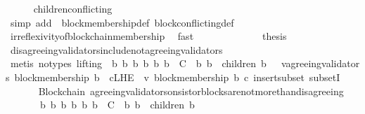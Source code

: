 \begin{isabellebody}
\ \ \ \ \isamarkupfalse%
\ children{\isacharunderscore}conflicting\isanewline
\ \ \ \ \isamarkupfalse%
\ {\isacharparenleft}simp\ add{\isacharcolon}\ \ block{\isacharunderscore}membership{\isacharunderscore}def\ block{\isacharunderscore}conflicting{\isacharunderscore}def{\isacharparenright}\isanewline
\ \ \ \ \isamarkupfalse%
\ irreflexivity{\isacharunderscore}of{\isacharunderscore}blockchain{\isacharunderscore}membership\ \isamarkupfalse%
\ fast\ \ \ \ \ \ \ \ \isanewline
\ \ \isamarkupfalse%
\ \isamarkupfalse%
\ {\isacharquery}thesis\isanewline
\ \ \ \ \isamarkupfalse%
\ disagreeing{\isacharunderscore}validators{\isacharunderscore}include{\isacharunderscore}not{\isacharunderscore}agreeing{\isacharunderscore}validators\isanewline
\ \ \ \ \isamarkupfalse%
\ {\isacharparenleft}metis\ {\isacharparenleft}no{\isacharunderscore}types{\isacharcomma}\ lifting{\isacharparenright}\ {\isacartoucheopen}{\isasymforall}{\isasymsigma}{\isasymin}{\isasymSigma}{\isachardot}\ {\isasymforall}b\ b{}\ b{}{\isachardot}\ {\isacharbraceleft}b{\isacharcomma}\ b{}{\isacharcomma}\ b{}{\isacharbraceright}\ {\isasymsubseteq}\ C\ {\isasymand}\ {\isacharbraceleft}b{}{\isacharcomma}\ b{}{\isacharbraceright}\ {\isasymsubseteq}\ children\ {\isacharparenleft}b{\isacharcomma}\ {\isasymsigma}{\isacharparenright}\ {\isasymlongrightarrow}\ {\isacharparenleft}{\isasymforall}v{\isasymin}agreeing{\isacharunderscore}validators\ {\isacharparenleft}block{\isacharunderscore}membership\ b{}{\isacharcomma}\ {\isasymsigma}{\isacharparenright}{\isachardot}\ {\isasymforall}c{\isasymin}L{\isacharunderscore}H{\isacharunderscore}E\ {\isasymsigma}\ v{\isachardot}\ block{\isacharunderscore}membership\ b{}\ c{\isacharparenright}{\isacartoucheclose}\ insert{\isacharunderscore}subset\ subsetI{\isacharparenright}\ \ \ \ \isanewline
{}\isamarkupfalse%
%
\endisatagproof
{\isafoldproof}%
%
\isadelimproof
\ \ \ \ \isanewline
%
\endisadelimproof
\isanewline
{}\isamarkupfalse%
\ {\isacharparenleft}\ Blockchain{\isacharparenright}\ agreeing{\isacharunderscore}validators{\isacharunderscore}on{\isacharunderscore}sistor{\isacharunderscore}blocks{\isacharunderscore}are{\isacharunderscore}not{\isacharunderscore}more{\isacharunderscore}than{\isacharunderscore}disagreeing\ {\isacharcolon}\isanewline
\ \ {\isachardoublequoteopen}{\isasymforall}\ {\isasymsigma}\ {\isasymin}\ {\isasymSigma}{\isachardot}\ {\isasymforall}\ b\ b{}\ b{}{\isachardot}\ {\isacharbraceleft}b{\isacharcomma}\ b{}{\isacharcomma}\ b{}{\isacharbraceright}\ {\isasymsubseteq}\ C\ {\isasymand}\ {\isacharbraceleft}b{}{\isacharcomma}\ b{}{\isacharbraceright}\ {\isasymsubseteq}\ children\ {\isacharparenleft}b{\isacharcomma}\ {\isasymsigma}{\isacharparenright}\ \isanewline

\end{isabellebody}
